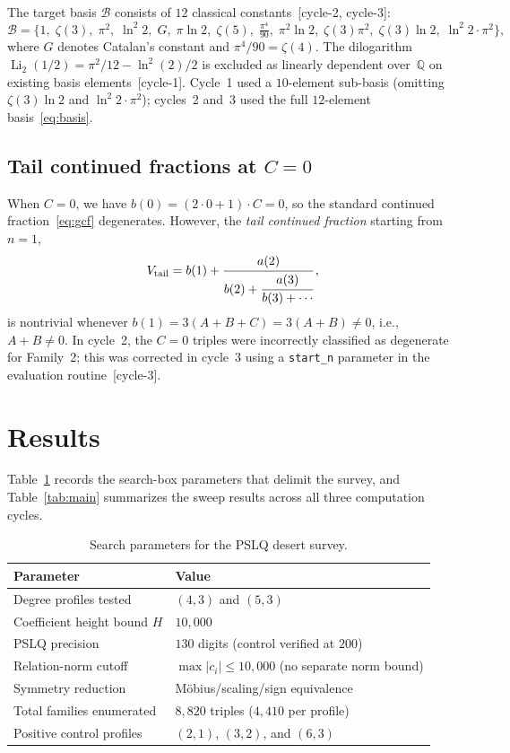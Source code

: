 \documentclass[11pt]{amsart}
\newcommand{\Q}{\mathbb{Q}}
\newcommand{\calB}{\mathcal{B}}
\theoremstyle{plain}
\theoremstyle{remark}
\begin{document}
The target basis $\calB$ consists of $12$ classical
constants~[cycle-2, cycle-3]:
\begin{equation}\label{eq:basis}
  \calB = \bigl\{
    1,\; \zeta(3),\; \pi^2,\; \ln^2\!2,\;
    G,\; \pi\ln 2,\; \zeta(5),\;
    \tfrac{\pi^4}{90},\;
    \pi^2\!\ln 2,\; \zeta(3)\pi^2,\;
    \zeta(3)\ln 2,\; \ln^2\!2 \cdot \pi^2
  \bigr\},
\end{equation}
where $G$ denotes Catalan's constant and
$\pi^4/90 = \zeta(4)$.
The dilogarithm $\operatorname{Li}_2(1/2) = \pi^2/12 - \ln^2(2)/2$
is excluded as linearly dependent over~$\Q$ on existing basis
elements~[cycle-1].
Cycle~1 used a $10$-element sub-basis (omitting
$\zeta(3)\ln 2$ and $\ln^2\!2 \cdot \pi^2$);
cycles~2 and~3 used the full $12$-element
basis~\eqref{eq:basis}.

\subsection{Tail continued fractions at $C = 0$}
When $C = 0$, we have $b(0) = (2 \cdot 0 + 1) \cdot C = 0$,
so the standard continued fraction~\eqref{eq:gcf} degenerates.
However, the \emph{tail continued fraction} starting from $n = 1$,
\[
  V_{\mathrm{tail}} = b(1) + \cfrac{a(2)}{b(2)
    + \cfrac{a(3)}{b(3) + \cdots}}\,,
\]
is nontrivial whenever $b(1) = 3(A + B + C) = 3(A+B) \neq 0$,
i.e., $A + B \neq 0$.
In cycle~2, the $C = 0$ triples were incorrectly classified as
degenerate for Family~2; this was corrected in cycle~3 using a
\texttt{start\_n} parameter in the evaluation
routine~[cycle-3].

\section{Results}\label{sec:results}

Table~\ref{tab:params} records the search-box parameters that
delimit the survey, and Table~\ref{tab:main} summarizes the
sweep results across all three computation cycles.

\begin{table}[h]
\centering
\caption{Search parameters for the PSLQ desert survey.}
\label{tab:params}
\begin{tabular}{ll}
\hline
Parameter & Value \\
\hline
Degree profiles tested & $(4,3)$ and $(5,3)$ \\
Coefficient height bound $H$ & $10{,}000$ \\
PSLQ precision & $130$ digits (control verified at $200$) \\
Relation-norm cutoff & $\max|c_i| \leq 10{,}000$ (no separate norm bound) \\
Symmetry reduction & M\"{o}bius/scaling/sign equivalence \\
Total families enumerated & $8{,}820$ triples ($4{,}410$ per profile) \\
Positive control profiles & $(2,1)$, $(3,2)$, and $(6,3)$ \\
\hline
\end{tabular}
\end{table}
\end{document}
